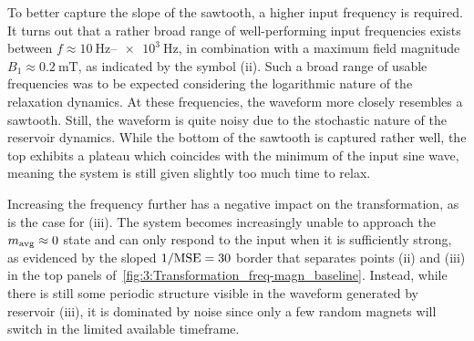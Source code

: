 \vspace{-1em}
\vspace{-1em}

To better capture the slope of the sawtooth, a higher input frequency is required.
It turns out that a rather broad range of well-performing input frequencies exists between $f \approx \SIrange{10}{e3}{\hertz}$, in combination with a maximum field magnitude $B_1 \approx \SI{0.2}{\milli\tesla}$, as indicated by the symbol \textsf{(ii)}.
Such a broad range of usable frequencies was to be expected considering the logarithmic nature of the relaxation dynamics.
At these frequencies, the waveform more closely resembles a sawtooth.
Still, the waveform is quite noisy due to the stochastic nature of the reservoir dynamics.
While the bottom of the sawtooth is captured rather well, the top exhibits a plateau which coincides with the minimum of the input sine wave, meaning the system is still given slightly too much time to relax. \par
Increasing the frequency further has a negative impact on the transformation, as is the case for \textsf{(iii)}.
The system becomes increasingly unable to approach the $m_\mathrm{avg} \approx 0$ state and can only respond to the input when it is sufficiently strong, as evidenced by the sloped $1/\mathrm{MSE}=30$ border that separates points \textsf{(ii)} and \textsf{(iii)} in the top panels of~\cref{fig:3:Transformation_freq-magn_baseline}.
Instead, while there is still some periodic structure visible in the waveform generated by reservoir \textsf{(iii)}, it is dominated by noise since only a few random magnets will switch in the limited available timeframe.

